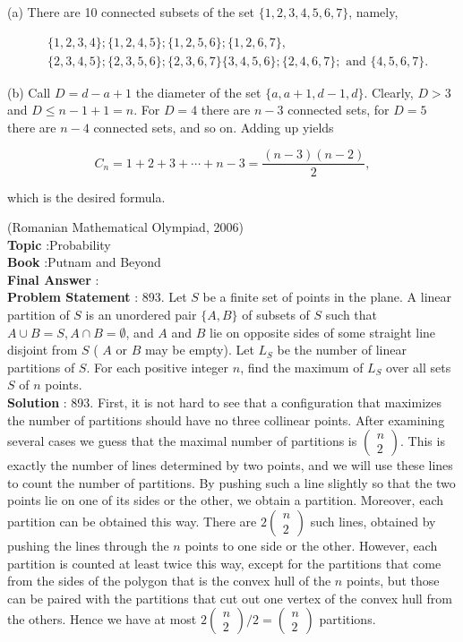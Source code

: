 \documentclass[10pt]{article}
\begin{document}
(a) There are 10 connected subsets of the set $\{1,2,3,4,5,6,7\}$, namely,

$$
\begin{aligned}
&\{1,2,3,4\} ;\{1,2,4,5\} ;\{1,2,5,6\} ;\{1,2,6,7\}, \\
&\{2,3,4,5\} ;\{2,3,5,6\} ;\{2,3,6,7\}\{3,4,5,6\} ;\{2,4,6,7\} ; \text { and }\{4,5,6,7\} .
\end{aligned}
$$

(b) Call $D=d-a+1$ the diameter of the set $\{a, a+1, d-1, d\}$. Clearly, $D>3$ and $D \leq n-1+1=n$. For $D=4$ there are $n-3$ connected sets, for $D=5$ there are $n-4$ connected sets, and so on. Adding up yields

$$
C_{n}=1+2+3+\cdots+n-3=\frac{(n-3)(n-2)}{2},
$$

which is the desired formula.

(Romanian Mathematical Olympiad, 2006)
\\
\textbf{Topic} :Probability\\
\textbf{Book} :Putnam and Beyond\\
\textbf{Final Answer} :\\


\textbf{Problem Statement} :
893. Let $S$ be a finite set of points in the plane. A linear partition of $S$ is an unordered pair $\{A, B\}$ of subsets of $S$ such that $A \cup B=S, A \cap B=\emptyset$, and $A$ and $B$ lie on opposite sides of some straight line disjoint from $S$ ( $A$ or $B$ may be empty). Let $L_{S}$ be the number of linear partitions of $S$. For each positive integer $n$, find the maximum of $L_{S}$ over all sets $S$ of $n$ points.
\\
\textbf{Solution} :
893. First, it is not hard to see that a configuration that maximizes the number of partitions should have no three collinear points. After examining several cases we guess that the maximal number of partitions is $\left(\begin{array}{l}n \\ 2\end{array}\right)$. This is exactly the number of lines determined by two points, and we will use these lines to count the number of partitions. By pushing such a line slightly so that the two points lie on one of its sides or the other, we obtain a partition. Moreover, each partition can be obtained this way. There are $2\left(\begin{array}{l}n \\ 2\end{array}\right)$ such lines, obtained by pushing the lines through the $n$ points to one side or the other. However, each partition is counted at least twice this way, except for the partitions that come from the sides of the polygon that is the convex hull of the $n$ points, but those can be paired with the partitions that cut out one vertex of the convex hull from the others. Hence we have at most $2\left(\begin{array}{l}n \\ 2\end{array}\right) / 2=\left(\begin{array}{l}n \\ 2\end{array}\right)$ partitions.
\end{document}
